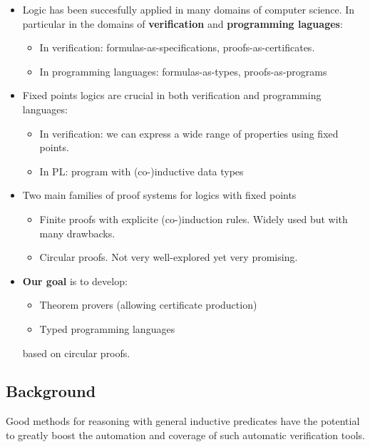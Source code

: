 \documentclass[11pt,twocolumn]{article}
\begin{document}
\begin{itemize}
\item Logic has been succesfully applied in many domains of computer science. In particular in the domains of \textbf{verification} and \textbf{programming laguages}:
  \begin{itemize}
  \item In verification: formulas-as-specifications, proofs-as-certificates. 
    \item In programming languages: formulas-as-types, proofs-as-programs
    \end{itemize}
\item Fixed points logics are crucial in both verification and programming languages:
  \begin{itemize}
  \item In verification: we can express a wide range of properties using fixed points.
   \item In PL: program with (co-)inductive data types 
  \end{itemize}
\item Two main families of proof systems for logics with fixed points
  \begin{itemize}
  \item Finite proofs with explicite (co-)induction rules. Widely used but with many drawbacks.
  \item Circular proofs. Not very well-explored yet very promising.
  \end{itemize}
\item \textbf{Our goal} is to develop:
  \begin{itemize}
  \item Theorem provers (allowing certificate production)
  \item Typed programming languages 
  \end{itemize}
  based on circular proofs.
\end{itemize}

\subsection{Background}

Good methods for reasoning with general inductive predicates have the potential to greatly boost the automation and coverage of such automatic verification tools.
\end{document}
